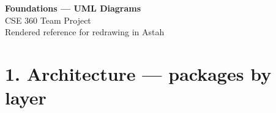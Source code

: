 \documentclass[11pt,a4paper]{article}
\begin{document}

\begin{center}
{\LARGE\bfseries Foundations --- UML Diagrams}\\[0.3em]
{\large CSE 360 Team Project}\\[0.8em]
{\color{muted}\small Rendered reference for redrawing in Astah}
\end{center}

\vspace{1em}

\section*{1. Architecture --- packages by layer}
\end{document}
